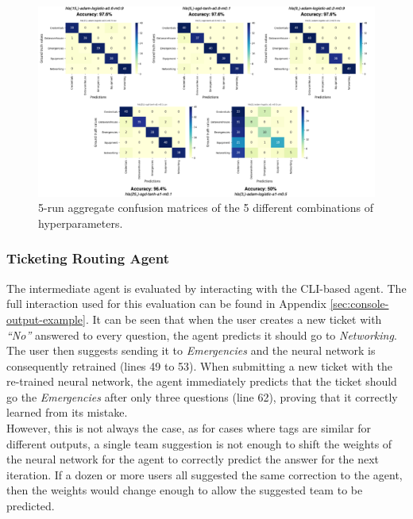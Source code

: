 \documentclass[letterpaper,12pt]{article}
\begin{document}
\begin{figure}[h] 
\centerline{\includegraphics[width=1.1\textwidth]{report/figures/confusion_matrices.png}}
\caption{\label{fig:confusion_matrices}5-run aggregate confusion matrices of the 5 different combinations of hyperparameters.}
\end{figure}

\subsubsection{Ticketing Routing Agent}

The intermediate agent is evaluated by interacting with the CLI-based agent. The full interaction used for this evaluation can be found in Appendix \ref{sec:console-output-example}. It can be seen that when the user creates a new ticket with \textit{``No''} answered to every question, the agent predicts it should go to \textit{Networking}. The user then suggests sending it to \textit{Emergencies} and the neural network is consequently retrained (lines 49 to 53). When submitting a new ticket with the re-trained neural network, the agent immediately predicts that the ticket should go the \textit{Emergencies} after only three questions (line 62), proving that it correctly learned from its mistake.\\

However, this is not always the case, as for cases where tags are similar for different outputs, a single team suggestion is not enough to shift the weights of the neural network for the agent to correctly predict the answer for the next iteration. If a dozen or more users all suggested the same correction to the agent, then the weights would change enough to allow the suggested team to be predicted.\\
\end{document}

